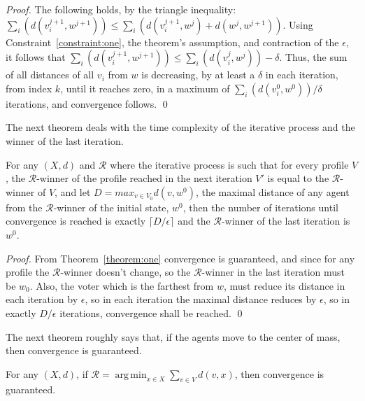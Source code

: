 \documentclass[runningheads,envcountsame]{llncs}
\DeclareMathOperator*{\argmin}{arg\,min}
\begin{document}
\begin{proof}
%
The following holds, by the triangle inequality:
  $\sum_i(d(v_i^{j+1},w^{j+1}))\leq \sum_i(d(v_i^{j+1},w^j) + d(w^j,w^{j+1}))$.
%
Using Constraint~\ref{constraint:one}, the theorem's assumption, and contraction of the $\epsilon$, it follows that $\sum_i(d(v_i^{j+1},w^{j+1}))\leq\sum_i(d(v_i^j,w^j))-\delta$.
Thus, the sum of all distances of all $v_i$ from $w$ is decreasing, by at least a $\delta$ in each iteration, from index $k$, until it reaches zero, in a maximum of $\sum_i(d(v_i^0,w^0))/\delta$ iterations, and convergence follows.
\qed\end{proof}

The next theorem deals with the time complexity of the iterative process and the winner of the last iteration.

\begin{theorem}\label{theorem:time}
  For any $(X, d)$ and $\mathcal{R}$ where the iterative process is such that for every profile $V$, the $\mathcal{R}$-winner of the profile reached in the next iteration $V'$ is equal to the $\mathcal{R}$-winner of $V$, and let $D=max_{v \in V_0} d(v, w^0)$, the maximal distance of any agent from the $\mathcal{R}$-winner of the initial state, $w^0$, then the number of iterations until convergence is reached is exactly $\lceil D/\epsilon \rceil$ and the $\mathcal{R}$-winner of the last iteration is $w^0$.
\end{theorem}

\begin{proof}
  From Theorem~\ref{theorem:one} convergence is guaranteed, and since for any profile the $\mathcal{R}$-winner doesn't change, so the $\mathcal{R}$-winner in the last iteration must be $w_0$. Also, the voter which is the farthest from $w$, must reduce its distance in each iteration by $\epsilon$, so in each iteration the maximal distance reduces by $\epsilon$, so in exactly $D/\epsilon$ iterations, convergence shall be reached.
\qed\end{proof}

The next theorem roughly says that, if the agents move to the center of mass, then convergence is guaranteed.

\begin{theorem}\label{theorem:mass}
  For any $(X, d)$,
  if $\mathcal{R} = \argmin_{x \in X} \sum_{v \in V} d(v, x)$, then convergence is guaranteed.
\end{theorem}
\end{document}
